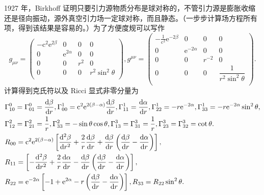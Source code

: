 \documentclass[11pt, a4paper, oneside, onecolumn]{ctexart}
\numberwithin{equation}{subsection}
\begin{document}
1927 年，Birkhoff 证明只要引力源物质分布是球对称的，不管引力源是膨胀收缩还是径向振动，源外真空引力场一定球对称，而且静态。（一步步计算场方程所有项，得到该结果是容易的。）为了方便度规可以写作
\begin{equation}
g_{\mu\nu}=\begin{pmatrix}
-\mathrm{c}^{2}\mathrm{e}^{2\beta} & 0 & 0 & 0\\
0 & \mathrm{e}^{2\alpha} & 0 & 0\\
0 & 0 & r^{2} & 0\\
0 & 0 & 0 & r^{2}\sin^{2}\theta\\
\end{pmatrix},
g^{\mu\nu}=\begin{pmatrix}
-\frac{1}{\mathrm{c}^{2}}\mathrm{e}^{-2\beta} & 0 & 0 & 0\\
0 & \mathrm{e}^{-2\alpha} & 0 & 0\\
0 & 0 & r^{-2} & 0\\
0 & 0 & 0 & \dfrac{1}{r^{2}\sin^{2}\theta}\\
\end{pmatrix}.
\end{equation}
计算得到克氏符以及 Ricci 显式非零分量为
\begin{align}
&\Gamma_{10}^{0}=\Gamma_{01}^{0}=\frac{\mathrm{d}\beta}{\mathrm{d}r},\Gamma_{00}^{1}=\mathrm{c}^{2}\mathrm{e}^{2\left(\beta-\alpha\right)}\frac{\mathrm{d}\beta}{\mathrm{d}r},\Gamma_{11}^{1}=\frac{\mathrm{d}\alpha}{\mathrm{d}r},\Gamma_{22}^{1}=-r\mathrm{e}^{-2\alpha},\Gamma_{33}^{1}=-r\mathrm{e}^{-2\alpha}\sin^{2}\theta,\notag\\
&\Gamma_{12}^{2}=\Gamma_{21}^{2}=\frac{1}{r},\Gamma_{33}^{2}=-\sin\theta\cos\theta,\Gamma_{13}^{3}=\Gamma_{31}^{3}=\frac{1}{r},\Gamma_{23}^{3}=\Gamma_{32}^{3}=\cot\theta.\notag\\
&R_{00}=\mathrm{c}^{2}\mathrm{e}^{2\left(\beta-\alpha\right)}\left[\frac{\mathrm{d}^{2}\beta}{\mathrm{d}r^{2}}+\frac{2}{r}\frac{\mathrm{d}\beta}{\mathrm{d}r}+\frac{\mathrm{d}\beta}{\mathrm{d}r}\left(\frac{\mathrm{d}\beta}{\mathrm{d}r}-\frac{\mathrm{d}\alpha}{\mathrm{d}r}\right)\right],\notag\\
&R_{11}=\left[-\frac{\mathrm{d}^{2}\beta}{\mathrm{d}r^{2}}+\frac{2}{r}\frac{\mathrm{d}\alpha}{\mathrm{d}r}-\frac{\mathrm{d}\beta}{\mathrm{d}r}\left(\frac{\mathrm{d}\beta}{\mathrm{d}r}-\frac{\mathrm{d}\alpha}{\mathrm{d}r}\right)\right],\notag\\
&R_{22}=\mathrm{e}^{-2\alpha}\left[-1+\mathrm{e}^{2\alpha}-r\left(\frac{\mathrm{d}\beta}{\mathrm{d}r}-\frac{\mathrm{d}\alpha}{\mathrm{d}r}\right)\right],R_{33}=R_{22}\sin^{2}\theta.\notag
\end{align}
\end{document}
